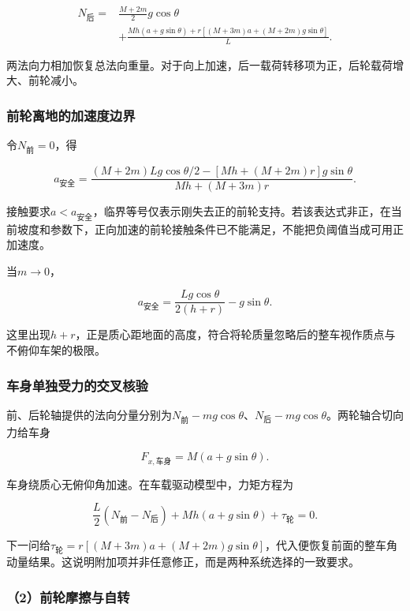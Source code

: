 \documentclass[12pt,a4paper,fontset=fandol]{ctexart}
\begin{document}
\[
\boxed{
\begin{aligned}
N_{\text{后}}
={}&\frac{M+2m}{2}g\cos\theta\\
&+\frac{Mh(a+g\sin\theta)
+r[(M+3m)a+(M+2m)g\sin\theta]}L.
\end{aligned}}
\]

两法向力相加恢复总法向重量。对于向上加速，后一载荷转移项为正，后轮载荷增大、前轮减小。

\subsubsection{前轮离地的加速度边界}\label{ux524dux8f6eux79bbux5730ux7684ux52a0ux901fux5ea6ux8fb9ux754c}

令\(N_{\text{前}}=0\)，得

\[
\boxed{
a_{\text{安全}}=
\frac{(M+2m)Lg\cos\theta/2
-[Mh+(M+2m)r]g\sin\theta}
{Mh+(M+3m)r}}.
\]

接触要求\(a<a_{\text{安全}}\)，临界等号仅表示刚失去正的前轮支持。若该表达式非正，在当前坡度和参数下，正向加速的前轮接触条件已不能满足，不能把负阈值当成可用正加速度。

当\(m\to0\)，

\[
\boxed{
a_{\text{安全}}=\frac{Lg\cos\theta}{2(h+r)}-g\sin\theta}.
\]

这里出现\(h+r\)，正是质心距地面的高度，符合将轮质量忽略后的整车视作质点与不俯仰车架的极限。

\subsubsection{车身单独受力的交叉核验}\label{ux8f66ux8eabux5355ux72ecux53d7ux529bux7684ux4ea4ux53c9ux6838ux9a8c}

前、后轮轴提供的法向分量分别为\(N_{\text{前}}-mg\cos\theta\)、\(N_{\text{后}}-mg\cos\theta\)。两轮轴合切向力给车身

\[
F_{x,\text{车身}}=M(a+g\sin\theta).
\]

车身绕质心无俯仰角加速。在车载驱动模型中，力矩方程为

\[
\frac L2(N_{\text{前}}-N_{\text{后}})
+Mh(a+g\sin\theta)+\tau_{\text{轮}}=0.
\]

下一问给\(\tau_{\text{轮}}=r[(M+3m)a+(M+2m)g\sin\theta]\)，代入便恢复前面的整车角动量结果。这说明附加项并非任意修正，而是两种系统选择的一致要求。

\subsubsection{（2）前轮摩擦与自转}\label{ux524dux8f6eux6469ux64e6ux4e0eux81eaux8f6c}
\end{document}
